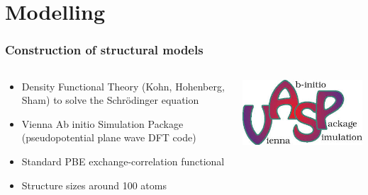 \documentclass[noamsthm,8pt,t]{beamer}
\begin{document}
\section{Modelling}
\begin{frame}
   \frametitle{Construction of structural models}
   \vspace{-0.3cm}
   \begin{columns}
      \begin{column}{0.8\textwidth}
         \begin{itemize}
            \item Density Functional Theory (Kohn, Hohenberg, Sham) to solve the Schrödinger equation
            \item Vienna Ab initio Simulation Package (pseudopotential plane wave DFT code)
            \item Standard PBE exchange-correlation functional
            \item Structure sizes around 100 atoms
         \end{itemize}
      \end{column}
      \begin{column}{0.2\textwidth}
         \begin{center}
            \includegraphics[width=0.9\linewidth]{figures/VASP.jpg}
         \end{center}
      \end{column}
   \end{columns}

   \pause


\end{frame}
\end{document}
